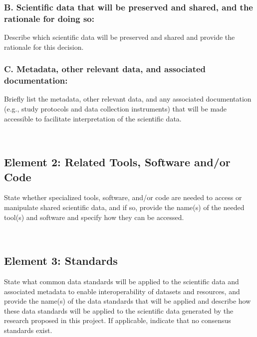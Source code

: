 \subsubsection*{B. Scientific data that will be preserved and shared, and the rationale for doing so:}

Describe which scientific data will be preserved and shared and provide the rationale for this decision. 

\subsubsection*{C. Metadata, other relevant data, and associated documentation: }

Briefly list the metadata, other relevant data, and any associated documentation (e.g., study protocols and data collection instruments) that will be made accessible to facilitate interpretation of the scientific data.

~

\subsection*{Element 2: Related Tools, Software and/or Code}

State whether specialized tools, software, and/or code are needed to access or manipulate shared scientific data, and if so, provide the name(s) of the needed tool(s) and software and specify how they can be accessed.

~

\subsection*{Element 3: Standards}

State what common data standards will be applied to the scientific data and associated metadata to enable interoperability of datasets and resources, and provide the name(s) of the data standards that will be applied and describe how these data standards will be applied to the scientific data generated by the research proposed in this project. If applicable, indicate that no consensus standards exist.

